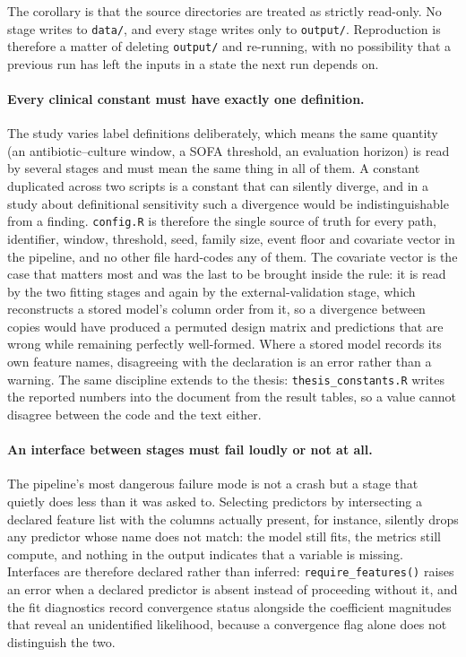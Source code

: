 The corollary is that the source directories are treated as strictly read-only.
No stage writes to \texttt{data/}, and every stage writes only to
\texttt{output/}. Reproduction is therefore a matter of deleting
\texttt{output/} and re-running, with no possibility that a previous run has
left the inputs in a state the next run depends on.

\paragraph{Every clinical constant must have exactly one definition.}
The study varies label definitions deliberately, which means the same quantity (an antibiotic--culture window, a SOFA threshold, an evaluation horizon)
is read by several stages and must mean the same thing in all of them. A
constant duplicated across two scripts is a constant that can silently diverge,
and in a study about definitional sensitivity such a divergence would be
indistinguishable from a finding. \texttt{config.R} is therefore the single
source of truth for every path, identifier, window, threshold, seed, family
size, event floor and covariate vector in the pipeline, and no other file
hard-codes any of them. The covariate vector is the case that matters most and
was the last to be brought inside the rule: it is read by the two fitting
stages and again by the external-validation stage, which reconstructs a stored
model's column order from it, so a divergence between copies would have
produced a permuted design matrix and predictions that are wrong while
remaining perfectly well-formed. Where a stored model records its own feature
names, disagreeing with the declaration is an error rather than a warning. The
same discipline extends to the thesis: \texttt{thesis\_constants.R} writes the
reported numbers into the document from the result tables, so a value cannot
disagree between the code and the text either.

\paragraph{An interface between stages must fail loudly or not at all.}
The pipeline's most dangerous failure mode is not a crash but a stage that
quietly does less than it was asked to. Selecting predictors by intersecting a
declared feature list with the columns actually present, for instance, silently
drops any predictor whose name does not match: the model still fits, the
metrics still compute, and nothing in the output indicates that a variable is
missing. Interfaces are therefore declared rather than inferred:
\texttt{require\_features()} raises an error when a declared predictor is absent
instead of proceeding without it, and the fit diagnostics record convergence
status alongside the coefficient magnitudes that reveal an unidentified
likelihood, because a convergence flag alone does not distinguish the two.

